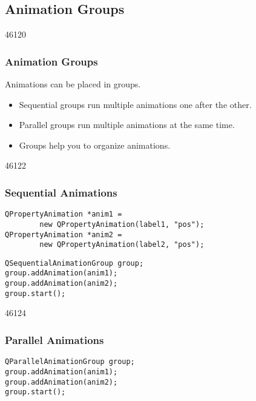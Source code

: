\subsection{Animation Groups}
\begin{slide}{46120}\frametitle{Animation Groups}
Animations can be placed in groups.

\begin{itemize}
\item Sequential groups run multiple animations one after the other.
\end{itemize}
\vfill
{}
\vfill
\begin{itemize}
\item Parallel groups run multiple animations at the same time.
\end{itemize}
\vfill
{}
\vfill
\begin{itemize}
\item Groups help you to organize animations.
\end{itemize}
\end{slide}


\begin{slide}[fragile]{46122}\frametitle{Sequential Animations}
\label{Animation-Sequential-Animations}

\small
\begin{lstlisting}
QPropertyAnimation *anim1 =
        new QPropertyAnimation(label1, "pos");
QPropertyAnimation *anim2 =
        new QPropertyAnimation(label2, "pos");
\end{lstlisting}
\vfill
{}
\vfill
\begin{lstlisting}
QSequentialAnimationGroup group;
group.addAnimation(anim1);
group.addAnimation(anim2);
group.start();
\end{lstlisting}
\normalsize
\vfill
{}
\end{slide}


\begin{slide}[fragile]{46124}\frametitle{Parallel Animations}
\label{Animation-Parallel-Animations}

\vfill
\small
\begin{lstlisting}
QParallelAnimationGroup group;
group.addAnimation(anim1);
group.addAnimation(anim2);
group.start();
\end{lstlisting}
\normalsize
\vfill
{}
\end{slide}

